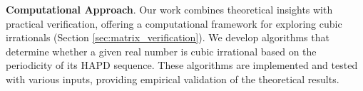\textbf{Computational Approach}. Our work combines theoretical insights with practical verification, offering a computational framework for exploring cubic irrationals (Section \ref{sec:matrix_verification}). We develop algorithms that determine whether a given real number is cubic irrational based on the periodicity of its HAPD sequence. These algorithms are implemented and tested with various inputs, providing empirical validation of the theoretical results.

